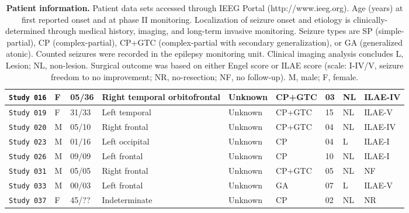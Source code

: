 \begin{table}
\begin{tabular}{|x{2cm}|x{0.5cm}|x{0.75cm}|x{2cm}|x{1.5cm}|x{1.25cm}|x{1cm}|x{1cm}|x{1.40cm}|}
        \verb|Study 016|     & F & 05/36 & Right temporal orbitofrontal & Unknown & CP+GTC & 03 & NL & ILAE-IV\\ \hline
        \verb|Study 019|     & F & 31/33 & Left temporal & Unknown & CP+GTC & 15 & NL & ILAE-V\\ \hline
        \verb|Study 020|     & M & 05/10 & Right frontal & Unknown & CP+GTC & 04 & NL & ILAE-IV\\ \hline
        \verb|Study 023|     & M & 01/16 & Left occipital & Unknown & CP & 04 & L & ILAE-I\\ \hline
        \verb|Study 026|     & M & 09/09 & Left frontal & Unknown & CP & 10 & NL & ILAE-I\\ \hline
        \verb|Study 031|     & M & 05/05 & Right frontal & Unknown & CP+GTC & 05 & NL & NF\\ \hline
        \verb|Study 033|     & M & 00/03 & Left frontal & Unknown & GA & 07 & L & ILAE-V\\ \hline
        \verb|Study 037|     & F & 45/?? & Indeterminate & Unknown & CP & 02 & NL & NR\\ \hline
    \end{tabular}
    \caption[Patient data set for Chapter \ref{ch:netdrivers}]{\textbf{Patient information.} Patient data sets accessed through IEEG Portal (http://www.ieeg.org). Age (years) at first reported onset and at phase II monitoring. Localization of seizure onset and etiology is clinically-determined through medical history, imaging, and long-term invasive monitoring. Seizure types are SP (simple-partial), CP (complex-partial), CP+GTC (complex-partial with secondary generalization), or GA (generalized atonic). Counted seizures were recorded in the epilepsy monitoring unit. Clinical imaging analysis concludes L, Lesion; NL, non-lesion. Surgical outcome was based on either Engel score or ILAE score (scale: I-IV/V, seizure freedom to no improvement; NR, no-resection; NF, no follow-up). M, male; F, female. \label{ch3:tab1}}
\end{table}

